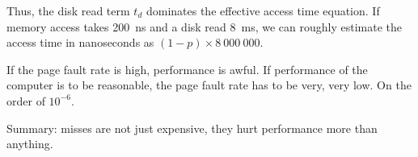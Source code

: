Thus, the disk read term $t_{d}$ dominates the effective access time equation. If memory access takes 200~ns and a disk read 8~ms, we can roughly estimate the access time in nanoseconds as $(1-p) \times 8~000~000$. 

If the page fault rate is high, performance is awful. If performance of the computer is to be reasonable, the page fault rate has to be very, very low. On the order of $10^{-6}$. 

Summary: misses are not just expensive, they hurt performance more than anything.





